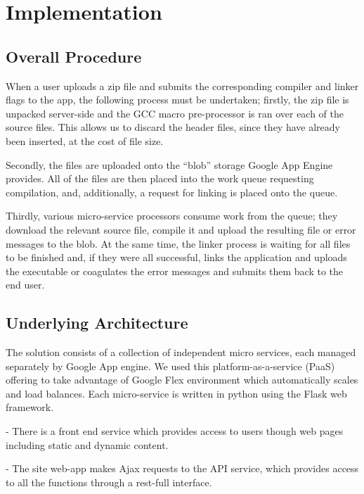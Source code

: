 \documentclass[conference]{IEEEtran}
\begin{document}

\section{Implementation}
\subsection{Overall Procedure}
When a user uploads a zip file and submits the corresponding compiler and linker
flags to the app, the following process must be undertaken; firstly, the zip
file is unpacked server-side and the GCC macro pre-processor is ran over each of
the source files. This allows us to discard the header files, since they have
already been inserted, at the cost of file size. 

Secondly, the files are uploaded onto the ``blob'' storage Google App Engine
provides. All of the files are then placed into the work queue requesting
compilation, and, additionally, a request for linking is placed onto the queue.

Thirdly, various micro-service processors consume work from the queue; they
download the relevant source file, compile it and upload the resulting file or
error messages to the blob. At the same time, the linker process is waiting for
all files to be finished and, if they were all successful, links the
application and uploads the executable or coagulates the error messages and
submits them back to the end user.
\subsection{Underlying Architecture}

The solution consists of a collection of independent micro services, each managed separately by Google App engine. We used this platform-as-a-service (PaaS) offering to take advantage of Google Flex environment which automatically scales and load balances. Each micro-service is written in python using the Flask web framework. 

- There is a front end service which provides access to users though web pages including static and dynamic content.

- The site web-app makes Ajax requests to the API service, which provides access to all the functions through a rest-full interface.
\end{document}
